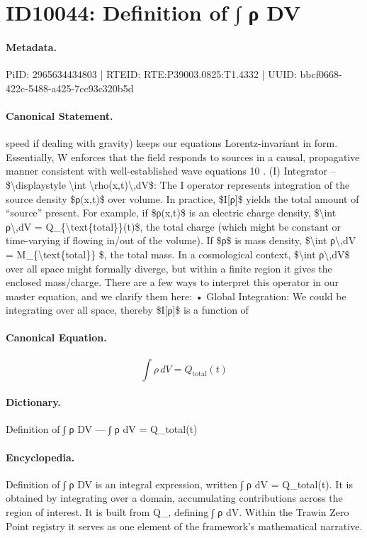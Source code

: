 \section*{ID10044: Definition of ∫ ρ DV}
\paragraph{Metadata.}
PiID: 2965634434803 | RTEID: RTE:P39003.0825:T1.4332 | UUID: bbcf0668-422c-5488-a425-7cc93c320b5d

\paragraph{Canonical Statement.}
speed if dealing with gravity) keeps our equations Lorentz-invariant in form. Essentially, W enforces that the field responds to sources in a causal, propagative manner consistent with well-established wave equations 10 . (I) Integrator – \$\textbackslash{}displaystyle \textbackslash{}int \textbackslash{}rho(x,t)\textbackslash{},dV\$: The I operator represents integration of the source density \$ρ(x,t)\$ over volume. In practice, \$I[ρ]\$ yields the total amount of “source” present. For example, if \$ρ(x,t)\$ is an electric charge density, \$\textbackslash{}int ρ\textbackslash{},dV = Q\_\{\textbackslash{}text\{total\}\}(t)\$, the total charge (which might be constant or time-varying if flowing in/out of the volume). If \$ρ\$ is mass density, \$\textbackslash{}int ρ\textbackslash{},dV = M\_\{\textbackslash{}text\{total\}\} \$, the total mass. In a cosmological context, \$\textbackslash{}int ρ\textbackslash{},dV\$ over all space might formally diverge, but within a finite region it gives the enclosed mass/charge. There are a few ways to interpret this operator in our master equation, and we clarify them here: • Global Integration: We could be integrating over all space, thereby \$I[ρ]\$ is a function of

\paragraph{Canonical Equation.}
\[
\int ρ\,dV = Q_{\text{total}}(t)
\]

\paragraph{Dictionary.}
Definition of ∫ ρ DV — ∫ ρ dV = Q\_total(t)

\paragraph{Encyclopedia.}
Definition of ∫ ρ DV is an integral expression, written ∫ ρ dV = Q\_total(t). It is obtained by integrating over a domain, accumulating contributions across the region of interest. It is built from Q\_, defining ∫ ρ dV. Within the Trawin Zero Point registry it serves as one element of the framework's mathematical narrative.
